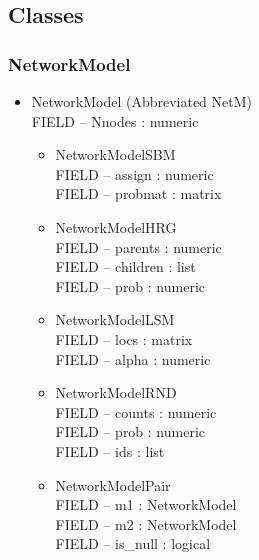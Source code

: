\documentclass[11pt]{article}
\begin{document}
\subsection{Classes}

\subsubsection{NetworkModel}
\begin{itemize}
\item NetworkModel (Abbreviated NetM)\\
FIELD -- Nnodes : numeric
\begin{itemize}
\item NetworkModelSBM\\
FIELD -- assign : numeric \\
FIELD -- probmat : matrix\\
\item NetworkModelHRG\\
FIELD -- parents : numeric\\
FIELD -- children : list\\
FIELD -- prob : numeric\\
\item NetworkModelLSM\\
FIELD -- locs : matrix\\
FIELD -- alpha : numeric\\
\item NetworkModelRND\\
FIELD -- counts : numeric\\
FIELD -- prob : numeric\\
FIELD -- ids : list\\
\item NetworkModelPair\\
FIELD -- m1 : NetworkModel\\
FIELD -- m2 : NetworkModel\\
FIELD -- is\_null : logical\\
\end{itemize}
\end{itemize}
\end{document}
